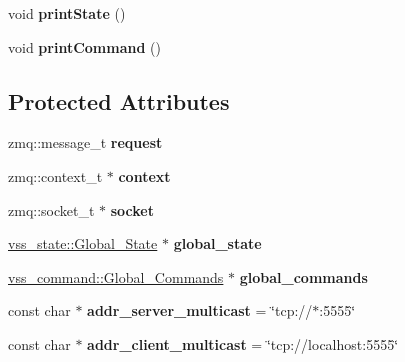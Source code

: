 \begin{DoxyCompactItemize}
\item 
void {\bfseries print\+State} ()\hypertarget{classInterface_ab8f9122465d78b9e41bfde9ea560a657}{}\label{classInterface_ab8f9122465d78b9e41bfde9ea560a657}

\item 
void {\bfseries print\+Command} ()\hypertarget{classInterface_aaa4e713b2b72649d5253c83bf9e2416a}{}\label{classInterface_aaa4e713b2b72649d5253c83bf9e2416a}

\end{DoxyCompactItemize}
\subsection*{Protected Attributes}
\begin{DoxyCompactItemize}
\item 
zmq\+::message\+\_\+t {\bfseries request}\hypertarget{classInterface_a99822a3bea1a0cb8c72670db0f797689}{}\label{classInterface_a99822a3bea1a0cb8c72670db0f797689}

\item 
zmq\+::context\+\_\+t $\ast$ {\bfseries context}\hypertarget{classInterface_a7a2bda6046550893e9454930636e76d5}{}\label{classInterface_a7a2bda6046550893e9454930636e76d5}

\item 
zmq\+::socket\+\_\+t $\ast$ {\bfseries socket}\hypertarget{classInterface_af38139f534f08df8b3dc9f29001e9584}{}\label{classInterface_af38139f534f08df8b3dc9f29001e9584}

\item 
\hyperlink{classvss__state_1_1Global__State}{vss\+\_\+state\+::\+Global\+\_\+\+State} $\ast$ {\bfseries global\+\_\+state}\hypertarget{classInterface_ac488bcc6708103cb36d132c895efa7a0}{}\label{classInterface_ac488bcc6708103cb36d132c895efa7a0}

\item 
\hyperlink{classvss__command_1_1Global__Commands}{vss\+\_\+command\+::\+Global\+\_\+\+Commands} $\ast$ {\bfseries global\+\_\+commands}\hypertarget{classInterface_a0109a54da68b3e7cd0c652f6cdd75abe}{}\label{classInterface_a0109a54da68b3e7cd0c652f6cdd75abe}

\item 
const char $\ast$ {\bfseries addr\+\_\+server\+\_\+multicast} = \char`\"{}tcp\+://$\ast$\+:5555\char`\"{}\hypertarget{classInterface_a13af5d0710e73dc30603c7fd13e763c9}{}\label{classInterface_a13af5d0710e73dc30603c7fd13e763c9}

\item 
const char $\ast$ {\bfseries addr\+\_\+client\+\_\+multicast} = \char`\"{}tcp\+://localhost\+:5555\char`\"{}\hypertarget{classInterface_a8215c1845687c3bceb55d2ab21f7f1ff}{}\label{classInterface_a8215c1845687c3bceb55d2ab21f7f1ff}


\end{DoxyCompactItemize}
